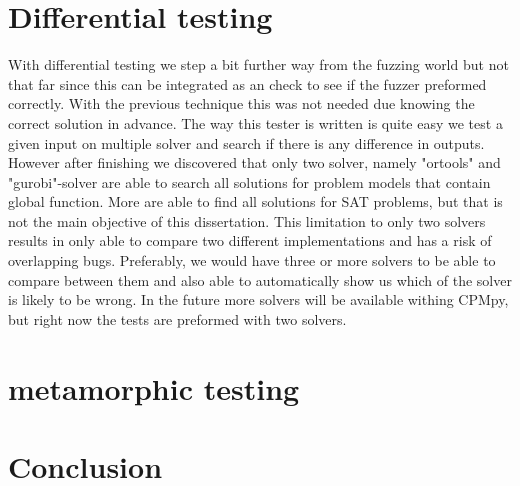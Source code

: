%

\section{Differential testing}
With differential testing we step a bit further way from the fuzzing world but not that far since this can be integrated as an check to see if the fuzzer preformed correctly. With the previous technique this was not needed due knowing the correct solution in advance. The way this tester is written is quite easy we test a given input on multiple solver and search if there is any difference in outputs.
However after finishing we discovered that only two solver, namely "ortools" and "gurobi"-solver are able to search all solutions for problem models that contain global function. More are able to find all solutions for SAT problems, but that is not the main objective of this dissertation. This limitation to only two solvers results in only able to compare two different implementations and has a risk of overlapping bugs. Preferably, we would have three or more solvers to be able to compare between them and also able to automatically show us which of the solver is likely to be wrong. In the future more solvers will be available withing CPMpy, but right now the tests are preformed with two solvers.

\section{metamorphic testing}


\section{Conclusion}
\label{impl:conclusion}

